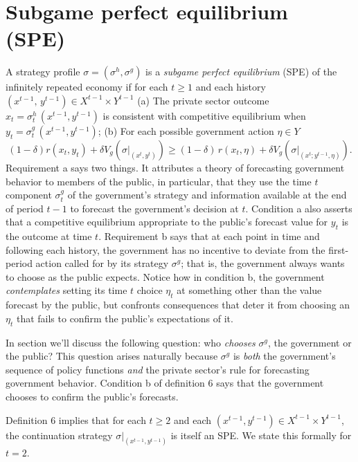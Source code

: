 \section{Subgame perfect equilibrium (SPE)}
\medskip{}  A strategy profile $\sigma = (\sigma^h,\sigma^g)$
is a {\it subgame perfect equilibrium} (SPE)
 of the infinitely repeated economy if for each
$t\geq 1$ and each history $(x^{t-1},\, y^{t-1}) \in X^{t-1}\times Y^{t-1}$
\medskip
\noindent(a)  The private sector outcome
 $x_t = \sigma^h_t\, (x^{t-1},y^{t-1})$ is consistent
with   competitive equilibrium when $y_t = \sigma^g_t\,(x^{t-1}, y^{t-1})$;
\medskip
\noindent(b)  For each possible government action $\eta \in  Y$
$$ (1-\delta)  r(x_t, y_t) + \delta V_g (\sigma\vert_{(x^t,
y^t)})
\geq  (1-\delta)\, r(x_t,\eta) +\delta V_g (\sigma\vert_{(x^t;
y^{t-1},\eta)}) .$$
\medskip\noindent
Requirement a
says two things.  It attributes a theory of forecasting government
behavior to members of the public, in particular, that they
use the time $t$ component $\sigma_t^g$ of the government's strategy
and information available at the end of period $t-1$ to
forecast the government's decision at $t$.  Condition a
also asserts that a competitive
equilibrium appropriate to the public's  forecast value for $y_t$ is
the outcome at time $t$.  Requirement b says that
at each point in time and  following each history, the
government has no incentive to deviate from the first-period action called
for by its strategy $\sigma^g$; that is, the government always
 wants
to choose as the public expects.   Notice
how in condition b, the government
{\it contemplates\/} setting its time $t$ choice $\eta_t$ at something
other than the value forecast by the public, but confronts consequences
 that deter it from  choosing an $\eta_t$ that
fails to confirm the public's expectations of it.

In section   we'll discuss the following question: who {\it chooses\/} $\sigma^g$,
the government or the public?  This question arises naturally because
$\sigma^g$ is {\it both\/} the government's sequence of policy
functions {\it and\/} the private sector's rule
for forecasting government behavior. Condition b of  definition 6
says that the government chooses to confirm the public's
forecasts.


  Definition 6  implies that for each $t \geq 2$ and each $(x^{t-1},
y^{t-1})
\in X^{t-1} \times Y^{t-1}$, the continuation strategy
$\sigma\vert_{(x^{t-1},y^{t-1})}$ is itself an SPE.
We state this formally for $t=2$.

